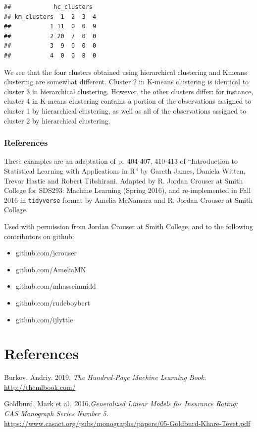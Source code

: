 \documentclass[
  openany]{book}
\providecommand{\tightlist}{%
  \setlength{\itemsep}{0pt}\setlength{\parskip}{0pt}}
\begin{document}
\begin{verbatim}
##            hc_clusters
## km_clusters  1  2  3  4
##           1 11  0  0  9
##           2 20  7  0  0
##           3  9  0  0  0
##           4  0  0  8  0
\end{verbatim}

We see that the four clusters obtained using hierarchical clustering and Kmeans
clustering are somewhat different. Cluster 2 in K-means clustering is
identical to cluster 3 in hierarchical clustering. However, the other clusters
differ: for instance, cluster 4 in K-means clustering contains a portion of
the observations assigned to cluster 1 by hierarchical clustering, as well as
all of the observations assigned to cluster 2 by hierarchical clustering.

\hypertarget{references-1}{%
\subsection{References}\label{references-1}}

These examples are an adaptation of p.~404-407, 410-413 of ``Introduction to
Statistical Learning with Applications in R'' by Gareth James, Daniela Witten, Trevor Hastie and Robert
Tibshirani. Adapted by R. Jordan Crouser at Smith College for SDS293: Machine Learning (Spring 2016), and re-implemented in Fall 2016 in \texttt{tidyverse} format by Amelia McNamara and R. Jordan Crouser at Smith College.

Used with permission from Jordan Crouser at Smith College, and to the following contributors on github:

\begin{itemize}
\tightlist
\item
  github.com/jcrouser
\item
  github.com/AmeliaMN
\item
  github.com/mhusseinmidd
\item
  github.com/rudeboybert
\item
  github.com/ijlyttle
\end{itemize}

\hypertarget{references-2}{%
\chapter{References}\label{references-2}}

Burkov, Andriy. 2019. \emph{The Hundred-Page Machine Learning Book.} \url{http://themlbook.com/}

Goldburd, Mark et al.~2016.\emph{Generalized Linear Models for Insurance Rating: CAS Monograph Series Number 5}. \url{https://www.casact.org/pubs/monographs/papers/05-Goldburd-Khare-Tevet.pdf}
\end{document}
